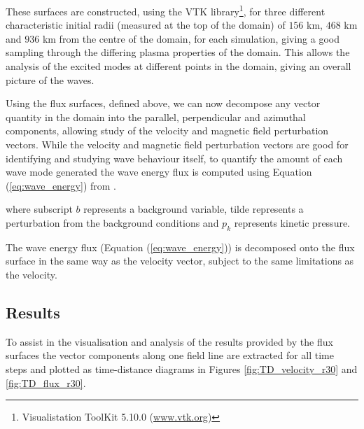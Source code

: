 These surfaces are constructed, using the VTK library\footnote{Visualistation ToolKit 5.10.0 (\url{www.vtk.org})}, for three different characteristic initial radii (measured at the top of the domain) of $156$ km, $468$ km and $936$ km from the centre of the domain, for each simulation, giving a good sampling through the differing plasma properties of the domain.
This allows the analysis of the excited modes at different points in the domain, giving an overall picture of the waves.

Using the flux surfaces, defined above, we can now decompose any vector quantity in the domain into the parallel, perpendicular and azimuthal components, allowing study of the velocity and magnetic field perturbation vectors.
While the velocity and magnetic field perturbation vectors are good for identifying and studying wave behaviour itself, to quantify the amount of each wave mode generated the wave energy flux is computed using Equation (\ref{eq:wave_energy}) from \cite{bogdan2003}.

where subscript $b$ represents a background variable, tilde represents a perturbation from the background conditions and $p_k$ represents kinetic pressure.

The wave energy flux (Equation (\ref{eq:wave_energy})) is decomposed onto the flux surface in the same way as the velocity vector, subject to the same limitations as the velocity.

\subsection{Results}\label{subsec:results}

To assist in the visualisation and analysis of the results provided by the flux surfaces the vector components along one field line are extracted for all time steps and plotted as time-distance diagrams in Figures \ref{fig:TD_velocity_r30} and \ref{fig:TD_flux_r30}.

